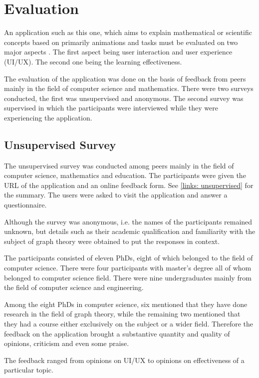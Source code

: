 
\section{Evaluation}

An application such as this one, which aims to explain mathematical or
scientific concepts based on primarily animations and tasks must be evaluated
on two major aspects . The first aspect being user interaction and user
experience (UI/UX). The second one being the learning effectiveness.


The evaluation of the application was done on the basis of feedback from peers
mainly in the field of computer science and mathematics. There were two surveys
conducted, the first was unsupervised and anonymous. The second survey was
supervised in which the participants were interviewed while they were
experiencing the application.

\subsection{Unsupervised Survey}
The unsupervised survey was conducted among peers mainly in the field of
computer science, mathematics and education. The participants were given the
URL of the application and an online feedback form. See \autoref{links:
unsupervised} for the summary. The users were asked to visit the application
and answer a questionnaire.

Although the survey was anonymous, i.e. the names of the participants remained
unknown, but details such as their academic qualification and familiarity with
the subject of graph theory were obtained to put the responses in context.

The participants consisted of eleven PhDs, eight of which belonged to the field
of computer science. There were four participants with master's degree all of
whom belonged to computer science field. There were nine undergraduates mainly
from the field of computer science and engineering.

Among the eight PhDs in computer science, six mentioned that they have done
research in the field of graph theory, while the remaining two mentioned that
they had a course either exclusively on the subject or a wider field.
Therefore the feedback on the application brought a substantive quantity and
quality of opinions, criticism and even some praise.

The feedback ranged from opinions on UI/UX to 
opinions on effectiveness of a particular topic.



